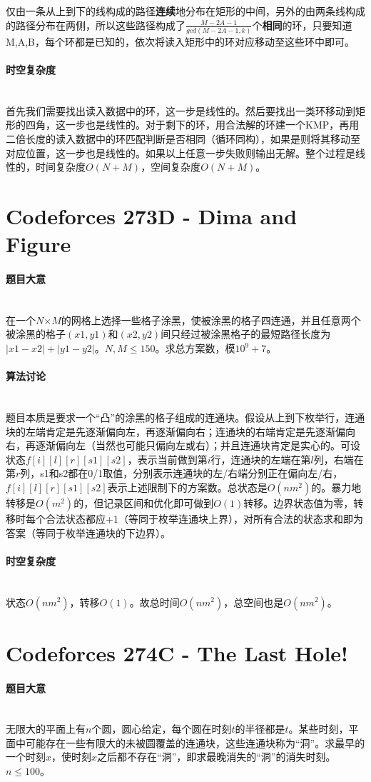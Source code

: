 \documentclass[UTF8]{ctexart}
\newcommand{\myparagraph}[1]{\paragraph{#1}\mbox{}\\}
\theoremstyle{nonumberplain}
\begin{document}
			仅由一条从上到下的线构成的路径\textbf{连续}地分布在矩形的中间，另外的由两条线构成的路径分布在两侧，所以这些路径构成了$\frac{M-2A-1}{gcd(M-2A-1,k)}$个\textbf{相同}的环，只要知道M,A,B，每个环都是已知的，依次将读入矩形中的环对应移动至这些环中即可。
		
		\myparagraph{时空复杂度}
		
			首先我们需要找出读入数据中的环，这一步是线性的。然后要找出一类环移动到矩形的四角，这一步也是线性的。对于剩下的环，用合法解的环建一个KMP，再用二倍长度的读入数据中的环匹配判断是否相同（循环同构），如果是则将其移动至对应位置，这一步也是线性的。如果以上任意一步失败则输出无解。整个过程是线性的，时间复杂度$O(N+M)$，空间复杂度$O(N+M)$。
	
	\section{Codeforces 273D - Dima and Figure}
	
		\myparagraph{题目大意}
		
			在一个$N$×$M$的网格上选择一些格子涂黑，使被涂黑的格子四连通，并且任意两个被涂黑的格子$(x1,y1)$和$(x2,y2)$间只经过被涂黑格子的最短路径长度为$|x1-x2|+|y1-y2|$。$N,M \leq 150$。求总方案数，模$10^9+7$。
		
		\myparagraph{算法讨论}
		
			题目本质是要求一个“凸”的涂黑的格子组成的连通块。假设从上到下枚举行，连通块的左端肯定是先逐渐偏向左，再逐渐偏向右；连通块的右端肯定是先逐渐偏向右，再逐渐偏向左（当然也可能只偏向左或右）；并且连通块肯定是实心的。可设状态$f[i][l][r][s1][s2]$，表示当前做到第$i$行，连通块的左端在第$l$列，右端在第$r$列，s1和s2都在0/1取值，分别表示连通块的左/右端分别正在偏向左/右，$f[i][l][r][s1][s2]$表示上述限制下的方案数。总状态是$O(nm^2)$的。暴力地转移是$O(m^2)$的，但记录区间和优化即可做到$O(1)$转移。边界状态值为零，转移时每个合法状态都应+1（等同于枚举连通块上界），对所有合法的状态求和即为答案（等同于枚举连通块的下边界）。
		
		\myparagraph{时空复杂度}
		
			状态$O(nm^2)$，转移$O(1)$。故总时间$O(nm^2)$，总空间也是$O(nm^2)$。
	
	\section{Codeforces 274C - The Last Hole!}
	
		\myparagraph{题目大意}
		
			无限大的平面上有$n$个圆，圆心给定，每个圆在时刻$t$的半径都是$t$。某些时刻，平面中可能存在一些有限大的未被圆覆盖的连通块，这些连通块称为“洞”。求最早的一个时刻$x$，使时刻$x$之后都不存在“洞”，即求最晚消失的“洞”的消失时刻。$n \leq 100$。
		
\end{document}
